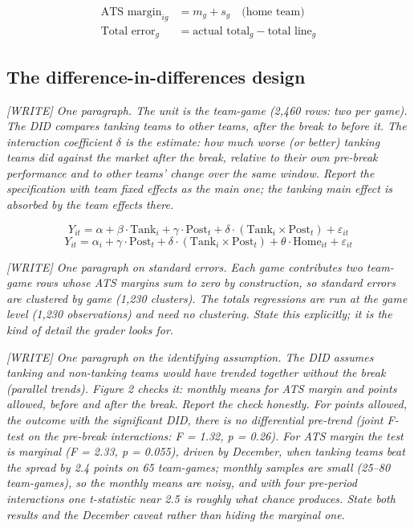 \documentclass[12pt,letterpaper]{article}
\newcommand{\writeprompt}[1]{{\color{gray}\textit{[WRITE] #1}}}
\begin{document}
\begin{align}
\text{ATS margin}_{ig} &= m_g + s_g \quad \text{(home team)} \label{eq:ats} \\
\text{Total error}_{g} &= \text{actual total}_g - \text{total line}_g \label{eq:toterr}
\end{align}

\subsection{The difference-in-differences design}

\writeprompt{One paragraph. The unit is the team-game (2,460 rows: two per
game). The DID compares tanking teams to other teams, after the break to
before it. The interaction coefficient $\delta$ is the estimate: how much
worse (or better) tanking teams did against the market after the break,
relative to their own pre-break performance and to other teams' change over
the same window. Report the specification with team fixed effects as the
main one; the tanking main effect is absorbed by the team effects there.}

\begin{equation}
Y_{it} = \alpha + \beta \cdot \text{Tank}_i + \gamma \cdot \text{Post}_t + \delta \cdot (\text{Tank}_i \times \text{Post}_t) + \varepsilon_{it} \label{eq:did}
\end{equation}
\begin{equation}
Y_{it} = \alpha_i + \gamma \cdot \text{Post}_t + \delta \cdot (\text{Tank}_i \times \text{Post}_t) + \theta \cdot \text{Home}_{it} + \varepsilon_{it} \label{eq:didfe}
\end{equation}

\writeprompt{One paragraph on standard errors. Each game contributes two
team-game rows whose ATS margins sum to zero by construction, so standard
errors are clustered by game (1,230 clusters). The totals regressions are
run at the game level (1,230 observations) and need no clustering. State
this explicitly; it is the kind of detail the grader looks for.}

\writeprompt{One paragraph on the identifying assumption. The DID assumes
tanking and non-tanking teams would have trended together without the break
(parallel trends). Figure 2 checks it: monthly means for ATS margin and
points allowed, before and after the break. Report the check honestly. For
points allowed, the outcome with the significant DID, there is no
differential pre-trend (joint F-test on the pre-break interactions: F = 1.32,
p = 0.26). For ATS margin the test is marginal (F = 2.33, p = 0.055),
driven by December, when tanking teams beat the spread by 2.4 points on 65
team-games; monthly samples are small (25--80 team-games), so the monthly
means are noisy, and with four pre-period interactions one t-statistic near
2.5 is roughly what chance produces. State both results and the December
caveat rather than hiding the marginal one.}
\end{document}
